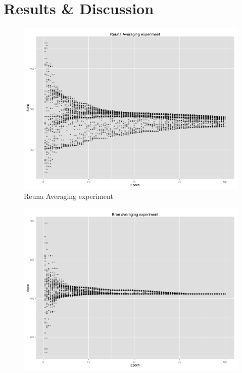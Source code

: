 \section{Results \& Discussion}
\begin{figure}[h!]
	\centering
    \begin{minipage}[t]{0.47\textwidth}
    \vspace{0pt}
    \includegraphics[width=\linewidth]{figures/Reuna.png}
    Reuna Averaging experiment
    \end{minipage}
    \begin{minipage}[t]{0.47\textwidth}
    \vspace{0pt}
    \includegraphics[width=\linewidth]{figures/Bren.png}

\end{minipage}
\end{figure}
